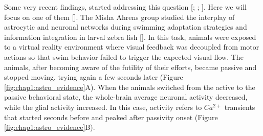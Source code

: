 Some very recent findings, started addressing this question [\cite{yumu2019glia}; \cite{mederos2020gabaergic}; \cite{kang2020activation}]. Here we will focus on one of them [\cite{yumu2019glia}].  
The Misha Ahrens group studied the interplay of astrocytic and neuronal networks during swimming adaptation strategies and information integration in larval zebra fish [\cite{yumu2019glia}]. 
In this task, animals were exposed to a virtual reality environment where visual feedback was decoupled from motor actions so that swim behavior failed to trigger the expected visual flow. 
The animals, after becoming aware of the futility of their efforts, became passive and stopped moving, trying again a few seconds later (Figure \ref{fig:chap1:astro_evidence}A). 
When the animals switched from the active to the passive behavioral state, the whole-brain average neuronal activity decreased, while the glial activity increased. 
In this case, activity refers to $Ca^{2+}$ transients that started seconds before and peaked after passivity onset (Figure \ref{fig:chap1:astro_evidence}B). 

